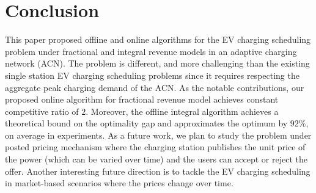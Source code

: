 \documentclass[journal]{IEEEtran}
\newcommand{\revv}[1]{{\color{black}#1}}%
\newcommand{\focs}{\textsc{foCS}\xspace}
\newcommand{\iocs}{\textsc{ioCS}\xspace}
\begin{document}
%					

\vspace{0.1mm}
\vspace{-4mm}
			\section{Conclusion}
			\label{sec:conclusion}
This paper proposed offline and online algorithms for the EV charging scheduling problem under fractional and integral revenue models in an adaptive charging network (ACN). The problem is different, and more challenging than the existing single station EV charging scheduling problems since it requires respecting the aggregate peak charging demand of the ACN. 
As the notable contributions, our proposed online algorithm for fractional revenue model achieves constant competitive ratio of $2$. Moreover, the offline integral algorithm achieves a theoretical bound on the optimality gap and approximates the optimum by $92\%$, on average in experiments. As a future work, we plan to study the problem under posted pricing mechanism where the charging station publishes the unit price of the power (which can be varied over time) and the users can accept or reject the offer.
\revv{Another interesting future direction is to tackle the EV charging scheduling in market-based scenarios where the prices change over time.}
\vspace{-4mm}
\end{document}
